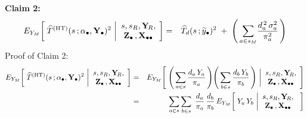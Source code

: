 \begin{enumerate}
    \vskip 0.5cm        
    \noindent
    \textbf{Claim 2:}\quad
    \begin{eqnarray*}
    E_{Y_{M}}\!\left[\;
        \widehat{T}^{\textnormal{(HT)}}(s\,;\alpha_{\bullet},\mathbf{Y}_{\bullet})^{2}
        \,\left\vert
        \begin{array}{c}
            s,s_{R},\mathbf{Y}_{\!R}, \\ \mathbf{Z}_{\bullet}\,,\mathbf{X}_{\bullet\bullet}
            \end{array}
        \right.
        \!\right]
    & = &
        \widehat{T}_{d}(s\,;\widetilde{y}_{\bullet})^{2}
        \; + \;
        \left(\,
            \underset{a \in {\color{black}s_{M}}}{\sum}
            \dfrac{d_{a}^{\,2}\,\sigma^{2}_{a}}{\pi_{a}^{2}}
            \,\right)
    \end{eqnarray*}
    \vskip 0.1cm
    \noindent
    Proof of Claim 2:\;\;
    \begin{eqnarray*}
    E_{Y_{M}}\!\left[\;
        \widehat{T}^{\textnormal{(HT)}}(s\,;\abullet,\Ydot)^{2}
        \,\left\vert
        \begin{array}{c}
            s,s_{R},\YsubR, \\ \Zdot\,,\Xobs
            \end{array}
        \right.
        \!\right]
    & = &
        E_{Y_{M}}\!\left[\;
            \left(\,
                \underset{a \in s}{\sum}\,\dfrac{d_{a}\,Y_{a}}{\pi_{a}}
                \,\right)
            \!
            \left(\,
                \underset{b \in s}{\sum}\,\dfrac{d_{b}\,Y_{b}}{\pi_{b}}
                \,\right)
            \,\left\vert
            \begin{array}{c}
                s,s_{R},\YsubR, \\ \Zdot\,,\Xobs
                \end{array}
            \right.
            \!\right]
    \\
    & = &
        \underset{a \in s}{\sum}\,
        \underset{b \in s}{\sum}\;\,
        \dfrac{d_{a}}{\pi_{a}}\,
        \dfrac{d_{b}}{\pi_{b}}\,
        E_{Y_{M}}\!\left[\;
            Y_{a}\,Y_{b}
            \,\left\vert
            \begin{array}{c}
                s,s_{R},\YsubR, \\ \Zdot\,,\Xobs
                \end{array}
            \right.
            \;\right]

\end{eqnarray*}
\end{enumerate}

